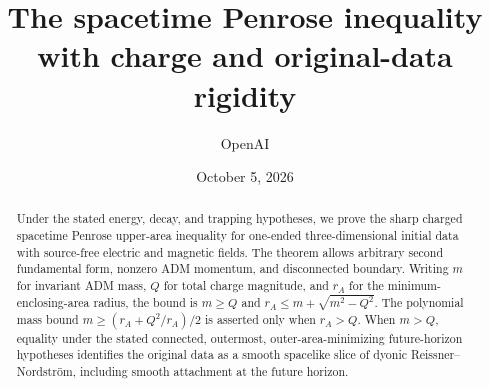 \documentclass[11pt,reqno]{amsart}
\title[Charged spacetime Penrose inequality]{The spacetime Penrose inequality with charge and original-data rigidity}
\author{OpenAI}
\date{October 5, 2026}
\begin{document}
\begin{abstract}
Under the stated energy, decay, and trapping hypotheses, we prove the
sharp charged spacetime Penrose upper-area inequality for one-ended
three-dimensional initial data with source-free electric and magnetic
fields. The theorem allows arbitrary second fundamental form, nonzero
ADM momentum, and disconnected boundary. Writing $m$ for invariant ADM
mass, $Q$ for total charge magnitude, and $r_A$ for the
minimum-enclosing-area radius, the bound is
$m\ge Q$ and $r_A\le m+\sqrt{m^2-Q^2}$. The polynomial mass bound
$m\ge(r_A+Q^2/r_A)/2$ is asserted only when $r_A>Q$.
When $m>Q$, equality under the stated connected, outermost,
outer-area-minimizing future-horizon hypotheses identifies the original
data as a smooth spacelike slice of dyonic Reissner--Nordstr\"om,
including smooth attachment at the future horizon.
\end{abstract}
\maketitle
\tableofcontents













\end{document}
